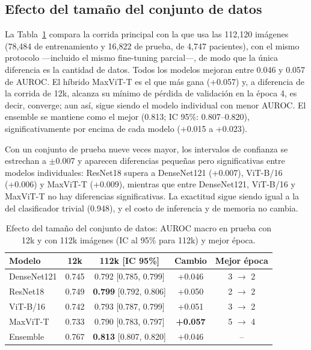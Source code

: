 \documentclass[conference]{IEEEtran}
\begin{document}
\subsection{Efecto del tamaño del conjunto de datos}
\label{sec:tamano}
La Tabla~\ref{tab:tamano} compara la corrida principal con la que usa las 112{,}120 imágenes (78{,}484 de entrenamiento y 16{,}822 de prueba, de 4{,}747 pacientes), con el mismo protocolo ---incluido el mismo fine-tuning parcial---, de modo que la única diferencia es la cantidad de datos. Todos los modelos mejoran entre 0.046 y 0.057 de AUROC. El híbrido MaxViT-T es el que más gana (+0.057) y, a diferencia de la corrida de 12k, alcanza su mínimo de pérdida de validación en la época 4, es decir, converge; aun así, sigue siendo el modelo individual con menor AUROC. El ensemble se mantiene como el mejor (0.813; IC 95\%: 0.807--0.820), significativamente por encima de cada modelo (+0.015 a +0.023).

Con un conjunto de prueba nueve veces mayor, los intervalos de confianza se estrechan a $\pm$0.007 y aparecen diferencias pequeñas pero significativas entre modelos individuales: ResNet18 supera a DenseNet121 (+0.007), ViT-B/16 (+0.006) y MaxViT-T (+0.009), mientras que entre DenseNet121, ViT-B/16 y MaxViT-T no hay diferencias significativas. La exactitud sigue siendo igual a la del clasificador trivial (0.948), y el costo de inferencia y de memoria no cambia.

\begin{table}[t]
\centering
\caption{Efecto del tamaño del conjunto de datos: AUROC macro en prueba con 12k y con 112k imágenes (IC al 95\% para 112k) y mejor época.}
\label{tab:tamano}
\setlength{\tabcolsep}{3pt}
\begin{tabular}{lcccc}
\toprule
Modelo & 12k & 112k [IC 95\%] & Cambio & Mejor época \\
\midrule
DenseNet121 & 0.745 & 0.792 [0.785, 0.799] & +0.046 & 3 $\rightarrow$ 2 \\
ResNet18 & 0.749 & \textbf{0.799} [0.792, 0.806] & +0.050 & 2 $\rightarrow$ 2 \\
ViT-B/16 & 0.742 & 0.793 [0.787, 0.799] & +0.051 & 3 $\rightarrow$ 2 \\
MaxViT-T & 0.733 & 0.790 [0.783, 0.797] & \textbf{+0.057} & 5 $\rightarrow$ 4 \\
\midrule
Ensemble & 0.767 & \textbf{0.813} [0.807, 0.820] & +0.046 & -- \\
\bottomrule
\end{tabular}
\end{table}
\end{document}
